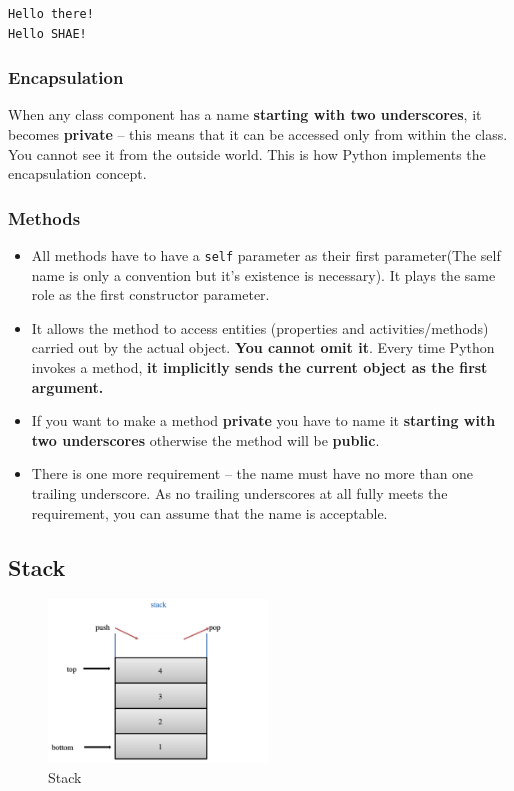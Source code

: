 \documentclass[11pt]{article}
\begin{document}
\begin{verbatim}
Hello there!
Hello SHAE!
\end{verbatim}

\subsubsection{Encapsulation}
\label{sec:orge3364cb}
When any class component has a name \textbf{starting with two underscores},
it becomes \textbf{private} – this means that it can be accessed only from
within the class. You cannot see it from the outside world. This is
how Python implements the encapsulation concept.

\subsubsection{Methods}
\label{sec:org916ce4e}
\begin{itemize}
\item All methods have to have a \texttt{self} parameter as their first
parameter(The self name is only a convention but it's existence is
necessary). It plays the same role as the first constructor parameter.
\item It allows the method to access entities (properties and
activities/methods) carried out by the actual object. \textbf{You cannot
omit it}. Every time Python invokes a method, \textbf{it implicitly sends the
current object as the first argument.}
\item If you want to make a method \textbf{private} you have to name it \textbf{starting
with two underscores} otherwise the method will be \textbf{public}.
\item There is one more requirement – the name must have no more than one
trailing underscore. As no trailing underscores at all fully meets
the requirement, you can assume that the name is acceptable.
\end{itemize}

\newpage
\subsection{Stack}
\label{sec:orgfe89c35}

\begin{figure}[htbp]
\centering
\includegraphics[width=220px]{./images/stack.png}
\caption{Stack}
\end{figure}
\end{document}
